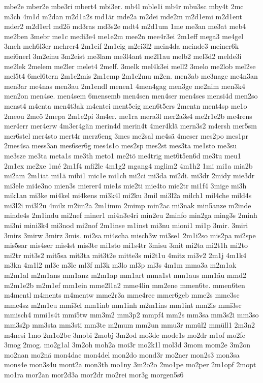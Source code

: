 {mbe2e
mber2e
mbe3ri
mbert4
mbi3er.
mb4l
mble1i
mb4r
mbu3sc
mby4t
2mc
m3ch
4m1d
m2dan
m2d1a2s
md1är
mde2a
m2dei
mde2m
m2d1emi
m2d1ent
mder2
m2d1erl
md2ö
md3ras
md3s2e
mdt4
m2d1um
1me
me3an
me3at
meb4
me2ben
3mebr
me1c
medi3e4
me1e2m
mee2n
mee4r3ei
2m1eff
mega3
me4gel
3meh
meh6l3er
mehrer4
2m1eif
2m1eig
m2ei3l2
mein4da
meinde3
meiner6k
mei6nerl
3m2einu
3m2eist
me3lam
me3l4ant
me2l1au
melb2
mel3d2
melde3i
me2lek
2melem
me2ler
melet4
2melf.
3melk
mel4k3ei
mell2
3melo
me2lob
mel2se
mel5t4
6mel6tern
2m1e2mis
2m1emp
2m1e2mu
m2en.
men3ab
me3nage
me4n3an
men3ar
me4nas
men3au
2m1endl
menen1
4men4gag
men3ge
me2nim
men3k4
men2on
men4se.
men4sem
6mensemb
men4sen
men4ser
men4ses
mensi4d
men2so
menst4
m4enta
men4t3ak
m4entei
ment5eig
men6t5ers
2mentn
ment4sp
me1o
2meou
2meö
2mepa
2m1e2pi
3m4er.
me1ra
mera3l
mer2a3s4
me2r1e2b
me4rens
mer4err
mer4erw
4m3er4gän
merin4d
merin4t
4mer4klä
mern3s2
m4ersh
mer5sm
mer6stel
mer4sto
mert4r
merz6eng
3mes
me2sal
me4sä
4meser
mes2po
mes1pr
2mes4sa
mess3an
mes6ser6g
mes4s1o
mes2sp
mes2st
mes3ta
me1sto
me3su
me3sze
me3ta
meta1s
me3th
meto1
me2tö
me4trig
met6t5en6d
me3tu
meu1
2m1ex
me2xe
1mé
2m1f4
mfi2le
4m1g2
mgang4
mglim2
4m1h2
1mi
mi1a
mia2b
mi2am
2m1iat
mi1ä
mibi1
mic1e
mi1ch
mi2ci
mi3da
mi2di.
mi3dr
2midy
mie3dr
mi3ele
mi4e3no
mien3s
mierer4
mie1s
mie2ti
mie4to
mie2tr
mi1f4
3mige
mi3h
mik1an
mi3ke
mi4kel
mi4kens
mi3k4l
mi2ku
3mil
mi3l2a
milch1
mil4che
mild4s
mi3l2i
mi3l2u
4milz
m2im2a
2m1imm
2mimp
min2ac
mi3nak
min5anze
m2inde
minde4s
2m1indu
mi2nef
miner1
mi4n3e4ri
min2eu
2minfo
min2ga
ming3s
2minh
mi3ni
mini3k4
mi3nod
mi2nof
2m1inse
m1inst
mi3nu
mioni1
mi1p
3mir.
3miri
3mirs
3mirw
3mirz
3mis.
mi2sa
mi4scha
misch3w
mi3se1
2m1i2so
mis2pa
mi2spe
mis5sar
mis4ser
mis4st
mis3te
mi1sto
mi1s4tr
3misu
3mit
mi2ta
mi2t1h
mi2to
mi2tr
mit3s2
mit5sa
mit3ta
mit3t2e
mitte3s
mi2t1u
4mitz
mi3v2
2m1j
4m1k4
m3kn
4m1l2
ml3c
m3le
ml3f
ml3k
m3lo
ml3p
ml3s
4m1m
mma3a
m2m1ak
m2m1al
m2m1ans
mm1anz
m2m1ap
mm1art
mma1st
mm1aus
mm1äu
mmd2
m2m1e2b
m2m1ef
mm1ein
mme2l1a2
mme4lin
mm2ene
mmen6te.
mmen6ten
m4mentl
m4ments
m4mentw
mme2r3a
mme4rec
mmer6geb
mme2s
mme3sc
mme4sz
m2m1eu
mmi3el
mm1inb
mm1inh
m2m1ins
mm1int
mm2is
mmi3sc
mmisch4
mmi1s4t
mmi5tw
mm3m2
mm3p2
mmpf4
mm2s
mm3sa
mm3s2i
mm3so
mm3s2p
mm3sta
mm3sti
mm3te
m2mum
mm2un
mmu3r
mmül2
mmüll1
2m3n2
m4nesi
1mo
2m1o2be
3mobi
2mobj
3m2od
mo3de
mode1s
mo2dr
m1of
mo2fe
3mog
2mog.
mo2g1al
3m2oh
moh2a
moi3r
mo2k1l
mol3d
3mom
mom2e
3m2on
mo2nan
mo2nä
mon4dac
mon4del
mon2do
mond3r
mo2ner
mon2s3
mon3sa
mons4e
mon3s4u
mont2a
mon3th
mo1ny
3m2o2o
2mo1pe
mo2per
2m1opf
2mopt
mo1ra
mor2an
mor2d3a
mor2dr
mo2rei
mor3g
morgen5s6
}
